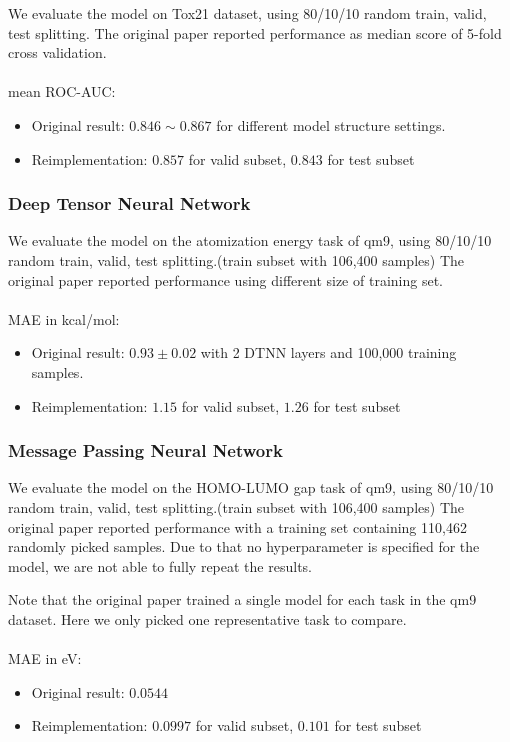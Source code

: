 We evaluate the model on Tox21 dataset, using 80/10/10 random train, valid, test splitting. The original paper reported performance as median score of 5-fold cross validation.\cite{kearnes2016graphconv}
~\\\\
mean ROC-AUC:
\begin{itemize}
    \item Original result: $0.846\sim0.867$ for different model structure settings.
    \item Reimplementation: $0.857$ for valid subset, $0.843$ for test subset
\end{itemize}

\subsubsection{Deep Tensor Neural Network}

We evaluate the model on the atomization energy task of qm9, using 80/10/10 random train, valid, test splitting.(train subset with 106,400 samples) The original paper reported performance using different size of training set.\cite{schutt2016quantum}
~\\\\
MAE in kcal/mol:
\begin{itemize}
    \item Original result: $0.93\pm0.02$ with 2 DTNN layers and 100,000 training samples.
    \item Reimplementation: $1.15$ for valid subset, $1.26$ for test subset
\end{itemize}

\subsubsection{Message Passing Neural Network}

We evaluate the model on the HOMO-LUMO gap task of qm9, using 80/10/10 random train, valid, test splitting.(train subset with 106,400 samples) The original paper reported performance with a training set containing 110,462 randomly picked samples.\cite{MPNN} Due to that no hyperparameter is specified for the model, we are not able to fully repeat the results.

Note that the original paper trained a single model for each task in the qm9 dataset. Here we only picked one representative task to compare. 
~\\\\
MAE in eV:
\begin{itemize}
    \item Original result: $0.0544$
    \item Reimplementation: $0.0997$ for valid subset, $0.101$ for test subset
\end{itemize}

